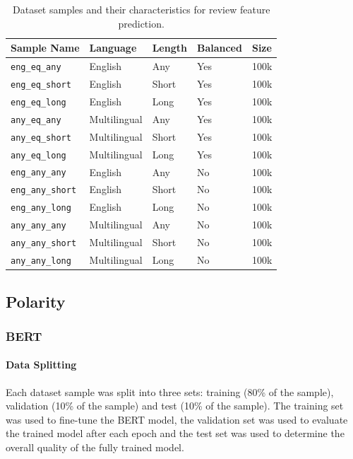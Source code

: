 \begin{table}[ht]
    \centering
    \begin{tabular}{l|l l l l}
        \toprule
        \textbf{Sample Name} & \textbf{Language} & \textbf{Length} & \textbf{Balanced} & \textbf{Size}\\\midrule
        \texttt{eng\_eq\_any} & English & Any & Yes & 100k\\
        \texttt{eng\_eq\_short} & English & Short & Yes & 100k\\
        \texttt{eng\_eq\_long} & English & Long & Yes & 100k\\
        \texttt{any\_eq\_any} & Multilingual & Any & Yes & 100k\\
        \texttt{any\_eq\_short} & Multilingual & Short & Yes & 100k\\
        \texttt{any\_eq\_long} & Multilingual & Long & Yes & 100k\\
        \texttt{eng\_any\_any} & English & Any & No & 100k\\
        \texttt{eng\_any\_short} & English & Short & No & 100k\\
        \texttt{eng\_any\_long} & English & Long & No & 100k\\
        \texttt{any\_any\_any} & Multilingual & Any & No & 100k\\
        \texttt{any\_any\_short} & Multilingual & Short & No & 100k\\
        \texttt{any\_any\_long} & Multilingual & Long & No & 100k\\
        \bottomrule
    \end{tabular}
    \caption{Dataset samples and their characteristics for review feature prediction.}
    \label{tab:DI_RF_Datasets}
\end{table}

\subsection{Polarity} \label{sec:DI_RF_Pol}

\subsubsection{BERT}

\paragraph{Data Splitting}

Each dataset sample was split into three sets: training (80\% of the sample), validation (10\% of the sample) and test (10\% of the sample). The training set was used to fine-tune the BERT model, the validation set was used to evaluate the trained model after each epoch and the test set was used to determine the overall quality of the fully trained model.

